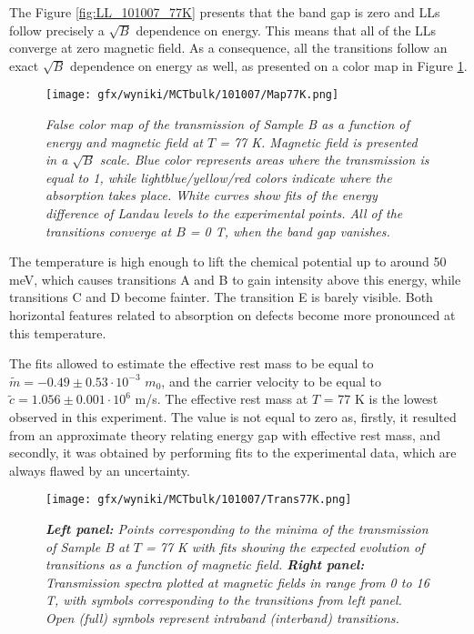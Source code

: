 \documentclass[titlepage,a4paper]{book}
\begin{document}
The Figure \ref{fig:LL_101007_77K} presents that the band gap is zero and LLs follow precisely a $\sqrt{B}$ dependence on energy. This means that all of the LLs converge at zero magnetic field. As a consequence, all the transitions follow an exact $\sqrt{B}$ dependence on energy as well, as presented on a color map in Figure \ref{fig:Map_101007_77K}. 

\begin{figure}[ht]
	\centering
	\texttt{[image: gfx/wyniki/MCTbulk/101007/Map77K.png]}
	\vspace{-10pt}
	\caption{\textit{False color map of the transmission of Sample B as a function of energy and magnetic field at $T$ = 77 K. Magnetic field is presented in a $\sqrt{B}$ scale. Blue color represents areas where the transmission is equal to 1, while lightblue/yellow/red colors indicate where the absorption takes place. White curves show fits of the energy difference of Landau levels to the experimental points. All of the transitions converge at $B$ = 0 T, when the band gap vanishes.}}
	\label{fig:Map_101007_77K}
\end{figure} 

The temperature is high enough to lift the chemical potential up to around 50 meV, which causes transitions A and B to gain intensity above this energy, while transitions C and D become fainter. The transition E is barely visible. Both horizontal features related to absorption on defects become more pronounced at this temperature.

The fits allowed to estimate the effective rest mass to be equal to $\tilde m = -0.49 \pm 0.53 \cdot 10^{-3}$ $m_0$, and the carrier velocity to be equal to $\tilde{c} = 1.056 \pm 0.001 \cdot 10^6$ m/s. The effective rest mass at $T$ = 77 K is the lowest observed in this experiment. The value is not equal to zero as, firstly, it resulted from an approximate theory relating energy gap with effective rest mass, and secondly, it was obtained by performing fits to the experimental data, which are always flawed by an uncertainty.  

\begin{figure}[ht]
	\centering
	\texttt{[image: gfx/wyniki/MCTbulk/101007/Trans77K.png]}
	\vspace{-10pt}
	\caption{\textit{\textbf{Left panel:} Points corresponding to the minima of the transmission of Sample B at $T$ = 77 K with fits showing the expected evolution of transitions as a function of magnetic field. \textbf{Right panel:} Transmission spectra plotted at magnetic fields in range from 0 to 16 T, with symbols corresponding to the transitions from left panel. Open (full) symbols represent intraband (interband) transitions.}}
	\label{fig:Spectra_101007_77K}
\end{figure}
\end{document}
